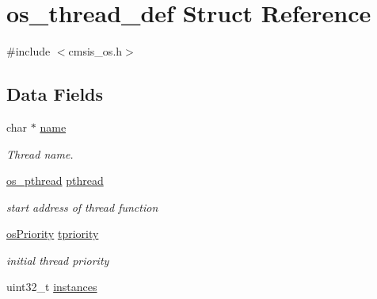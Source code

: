 \hypertarget{structos__thread__def}{}\section{os\+\_\+thread\+\_\+def Struct Reference}
\label{structos__thread__def}


{\ttfamily \#include $<$cmsis\+\_\+os.\+h$>$}

\subsection*{Data Fields}
\begin{DoxyCompactItemize}
\item 
\mbox{\label{structos__thread__def_a5ac083a645d964373f022d03df4849c8}} 
char $\ast$ \mbox{\hyperlink{structos__thread__def_a5ac083a645d964373f022d03df4849c8}{name}}
\begin{DoxyCompactList}\small\item\em Thread name. \end{DoxyCompactList}\item 
\mbox{\label{structos__thread__def_ad3c9624ee214329fb34e71f544a6933e}} 
\mbox{\hyperlink{cmsis__os_8h_a3a96994ab8318050b476d72d890ce765}{os\+\_\+pthread}} \mbox{\hyperlink{structos__thread__def_ad3c9624ee214329fb34e71f544a6933e}{pthread}}
\begin{DoxyCompactList}\small\item\em start address of thread function \end{DoxyCompactList}\item 
\mbox{\label{structos__thread__def_a15da8f23c6fe684b70a73646ada685e7}} 
\mbox{\hyperlink{cmsis__os_8h_a7f2b42f1983b9107775ec2a1c69a849a}{os\+Priority}} \mbox{\hyperlink{structos__thread__def_a15da8f23c6fe684b70a73646ada685e7}{tpriority}}
\begin{DoxyCompactList}\small\item\em initial thread priority \end{DoxyCompactList}\item 
\mbox{\label{structos__thread__def_aa4c4115851a098c0b87358ab6c025603}} 
uint32\+\_\+t \mbox{\hyperlink{structos__thread__def_aa4c4115851a098c0b87358ab6c025603}{instances}}

\end{DoxyCompactItemize}
